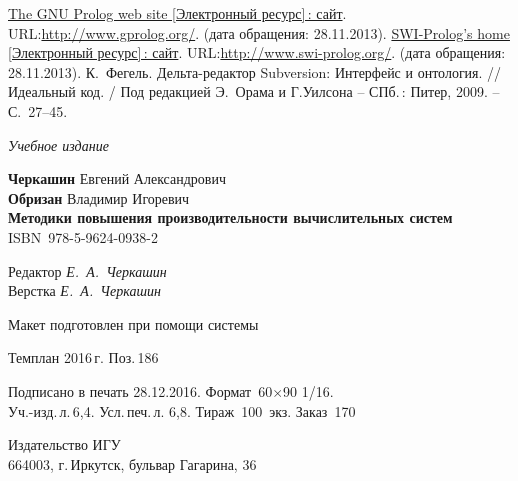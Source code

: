 \documentclass[14pt, a4paper, openany, twoside, final]{extbook} %
\def\emphbib#1{#1}
\begin{document}
\begin{thebibliography}{99}
 \emphbib{\href{http://www.gprolog.org/}{The GNU Prolog web site [Электронный ресурс]\,{}: сайт}}. URL:\url{http://www.gprolog.org/}. (дата обращения: 28.11.2013).
 \emphbib{\href{http://www.swi-prolog.org/}{SWI-Prolog's
      home [Электронный ресурс]\,{}:
      сайт}}. URL:\url{http://www.swi-prolog.org/}. (дата обращения:
  28.11.2013).
 К.~Фегель. Дельта-редактор Subversion: Интерфейс и
  онтология. // Идеальный код. / Под редакцией Э.~Орама и Г.Уилсона --
  СПб.\,: Питер, 2009. -- С.~27--45.
\end{thebibliography}
\label{lastpage}
\newpage
\thispagestyle{empty}
\mbox{}

\vfill\vfill\vfill\vfill

\hfill{}{\small\itshape Учебное издание}
\vspace{4ex}
\begin{center}
{\small\textbf{Черкашин} Евгений Александрович\\}
{\small\textbf{Обризан} Владимир Игоревич \\[1em]}
{\bfseries Методики повышения производительности вычислительных систем}\\[1em]
ISBN~978-5-9624-0938-2
\vfill

\small
Редактор \textit{Е.~А.~Черкашин}\\
Верстка \textit{Е.~А.~Черкашин}

\vfill{}
{\small Макет подготовлен при помощи системы \LuaLaTeX\\\mbox{}}
\vfill{}

Темплан 2016\,{}г. Поз.\,{}186

\end{center}
\begin{center}\small
\noindent Подписано в печать 28.12.2016.
Формат~60$\times$90 1/16.\\  %
Уч.-изд.\,{}л.\,{}6,4. Усл.\,{}печ.\,{}л. 6,8. Тираж~100~экз. Заказ~170
\end{center}
\vspace{1           ex}
\begin{center}\small
Издательство ИГУ\\{}
664003, г.\,{}Иркутск, бульвар Гагарина, 36
\end{center}
\end{document}
